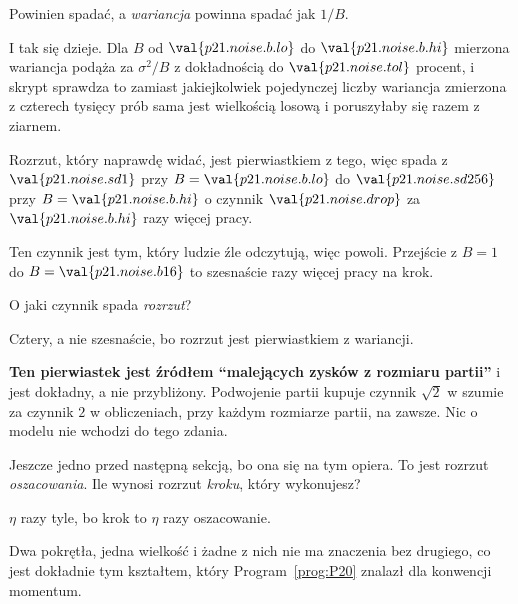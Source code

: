 \begin{fr}
\begin{ansblock}
Powinien spadać, a \emph{wariancja} powinna spadać jak $1/B$.
\end{ansblock}

I tak się dzieje. Dla $B$ od $\val{p21.noise.b.lo}$ do $\val{p21.noise.b.hi}$
mierzona wariancja podąża za $\sigma^{2}/B$ z dokładnością do
$\val{p21.noise.tol}$ procent, i skrypt sprawdza to zamiast jakiejkolwiek
pojedynczej liczby \dash{} wariancja zmierzona z czterech tysięcy prób sama
jest wielkością losową i poruszyłaby się razem z ziarnem.

Rozrzut, który naprawdę widać, jest pierwiastkiem z tego, więc spada z
$\val{p21.noise.sd1}$ przy $B = \val{p21.noise.b.lo}$ do
$\val{p21.noise.sd256}$ przy $B = \val{p21.noise.b.hi}$ \dash{} o czynnik
$\val{p21.noise.drop}$ za $\val{p21.noise.b.hi}$ razy więcej pracy.
\end{fr}

\begin{fr}
Ten czynnik jest tym, który ludzie źle odczytują, więc powoli. Przejście z
$B = 1$ do $B = \val{p21.noise.b16}$ to szesnaście razy więcej pracy na krok.

O jaki czynnik spada \emph{rozrzut}?
\nextframe
\end{fr}

\begin{fr}
Cztery, a nie szesnaście, bo rozrzut jest pierwiastkiem z wariancji.

\textbf{Ten pierwiastek jest źródłem \enquote{malejących zysków z rozmiaru
partii}} i jest dokładny, a nie przybliżony. Podwojenie partii kupuje czynnik
$\sqrt{2}$ w szumie za czynnik $2$ w obliczeniach, przy każdym rozmiarze
partii, na zawsze. Nic o modelu nie wchodzi do tego zdania.


Jeszcze jedno przed następną sekcją, bo ona się na tym opiera. To jest rozrzut
\emph{oszacowania}. Ile wynosi rozrzut \emph{kroku}, który wykonujesz?
\nextframe
\end{fr}

\begin{fr}
\begin{ansblock}
$\eta$ razy tyle, bo krok to $\eta$ razy oszacowanie.
\end{ansblock}

Dwa pokrętła, jedna wielkość \dash{} i żadne z nich nie ma znaczenia bez
drugiego, co jest dokładnie tym kształtem, który Program~\ref{prog:P20} znalazł
dla konwencji momentum.
\end{fr}

